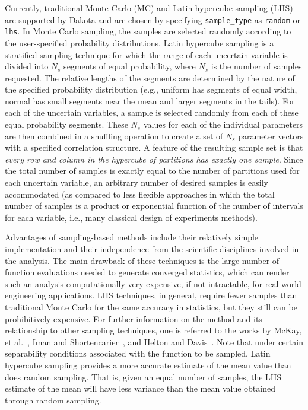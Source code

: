 Currently, traditional Monte Carlo (MC) and Latin hypercube sampling
(LHS) are supported by Dakota and are chosen by specifying
\texttt{sample\_type} as \texttt{random} or \texttt{lhs}. In Monte
Carlo sampling, the samples are selected randomly according to the
user-specified probability distributions. Latin hypercube sampling is
a stratified sampling technique for which the range of each uncertain
variable is divided into $N_{s}$ segments of equal probability, where
$N_{s}$ is the number of samples requested. The relative lengths of
the segments are determined by the nature of the specified probability
distribution (e.g., uniform has segments of equal width, normal has
small segments near the mean and larger segments in the tails). For
each of the uncertain variables, a sample is selected randomly from
each of these equal probability segments. These $N_{s}$ values for
each of the individual parameters are then combined in a shuffling
operation to create a set of $N_{s}$ parameter vectors with a
specified correlation structure. A feature of the resulting sample set
is that 
\emph{every row and column in the hypercube of partitions has exactly one sample}.
Since the total number of samples is exactly equal
to the number of partitions used for each uncertain variable, an
arbitrary number of desired samples is easily accommodated (as
compared to less flexible approaches in which the total number of
samples is a product or exponential function of the number of
intervals for each variable, i.e., many classical design of
experiments methods).

Advantages of sampling-based methods include their relatively simple
implementation and their independence from the scientific disciplines
involved in the analysis. The main drawback of these techniques is the
large number of function evaluations needed to generate converged
statistics, which can render such an analysis computationally very
expensive, if not intractable, for real-world engineering
applications. LHS techniques, in general, require fewer samples than
traditional Monte Carlo for the same accuracy in statistics, but they
still can be prohibitively expensive. For further information on the
method and its relationship to other sampling techniques, one is
referred to the works by McKay, et al.~\cite{Mck79}, Iman and
Shortencarier~\cite{Ima84}, and Helton and Davis~\cite{Hel00}.
Note that under certain separability conditions associated with the 
function to be sampled,
Latin hypercube sampling provides a more accurate estimate of the mean
value than does random sampling. That is, given an equal number of
samples, the LHS estimate of the mean will have less variance than the
mean value obtained through random sampling.

